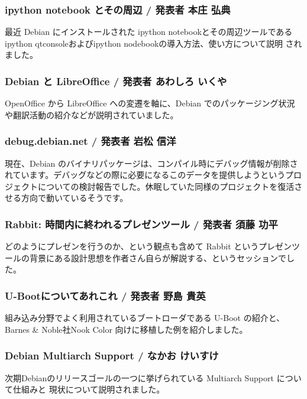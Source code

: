 \documentclass[mingoth,a4paper]{jsarticle}
\begin{document}
\subsubsection{ipython notebook とその周辺 / 発表者 本庄 弘典}

最近 Debian にインストールされた ipython notebookとその周辺ツールである ipython qtconsoleおよびipython nodebookの導入方法、使い方について説明
されました。

\subsubsection{Debian と LibreOffice / 発表者 あわしろ いくや}

OpenOffice から LibreOffice への変遷を軸に、Debian でのパッケージング状況や翻訳活動の紹介などが説明されていました。

\subsubsection{debug.debian.net / 発表者 岩松 信洋}

現在、Debian のバイナリパッケージは、コンパイル時にデバッグ情報が削除されています。デバッグなどの際に必要になるこのデータを提供しようというプロジェクトについての検討報告でした。休眠していた同様のプロジェクトを復活させる方向で動いているそうです。

\subsubsection{Rabbit: 時間内に終われるプレゼンツール / 発表者 須藤 功平}

どのようにプレゼンを行うのか、という観点も含めて Rabbit というプレゼンツールの背景にある設計思想を作者さん自らが解説する、というセッションでした。

\subsubsection{U-Bootについてあれこれ / 発表者 野島 貴英}

組み込み分野でよく利用されているブートローダである U-Boot の紹介と、Barnes \& Noble社Nook Color 向けに移植した例を紹介しました。

\subsubsection{Debian Multiarch Support / なかお けいすけ}

次期Debianのリリースゴールの一つに挙げられている Multiarch Support について仕組みと
現状について説明されました。
\end{document}
